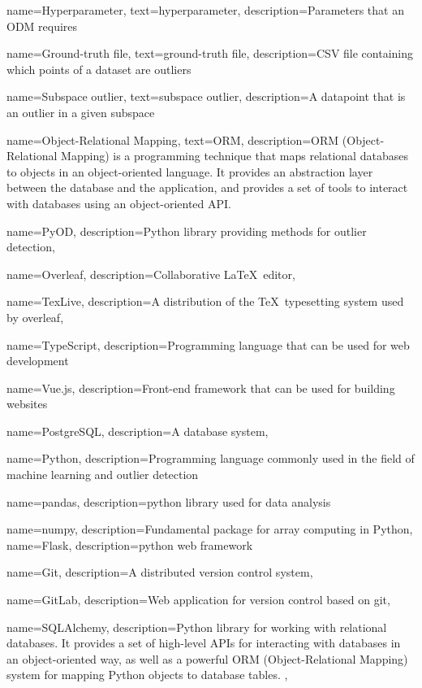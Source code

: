 {
    name={Hyperparameter},
    text={hyperparameter},
    description={Parameters that an \gls*{ODM} requires}
}

{
    name={Ground-truth file},
    text={ground-truth file},
    description={\gls*{CSV} file containing which points of a dataset are outliers}
}

{
    name={Subspace outlier},
    text={subspace outlier},
    description={A datapoint that is an outlier in a given \gls*{subspace}}
}

{
    name={Object-Relational Mapping},
    text={ORM},
    description={ORM (Object-Relational Mapping) is a programming technique that maps relational databases to objects in an object-oriented language. It provides an abstraction layer between the database and the application, and provides a set of tools to interact with databases using an object-oriented API.}
}


{
    name={PyOD},
    description={Python library providing methods for outlier detection},
}

{
    name={Overleaf},
    description={Collaborative \LaTeX\ editor},
}

{
    name={TexLive},
    description={A distribution of the \TeX\ typesetting system used by \gls*{overleaf}},
}

{
    name={TypeScript},
    description={Programming language that can be used for web development}
}

{
    name={Vue.js},
    description={Front-end framework that can be used for building websites}
}

{
    name={PostgreSQL},
    description={A database system},
}

{
    name={Python},
    description={Programming language commonly used in the field of machine learning and outlier detection}
}

{
    name={pandas},
    description={\Gls*{python} library used for data analysis}
}

{
    name={numpy},
    description={Fundamental package for array computing in Python},
}
{
    name={Flask},
    description={\Gls*{python} web framework}
}

{
    name={Git},
    description={A distributed version control system},
}

{
    name={GitLab},
    description={Web application for version control based on \gls*{git}},
}

{
    name={SQLAlchemy},
    description={Python library for working with relational databases. It provides a set of high-level APIs for interacting with databases in an object-oriented way, as well as a powerful \Gls{ORM} (Object-Relational Mapping) system for mapping Python objects to database tables. },
}